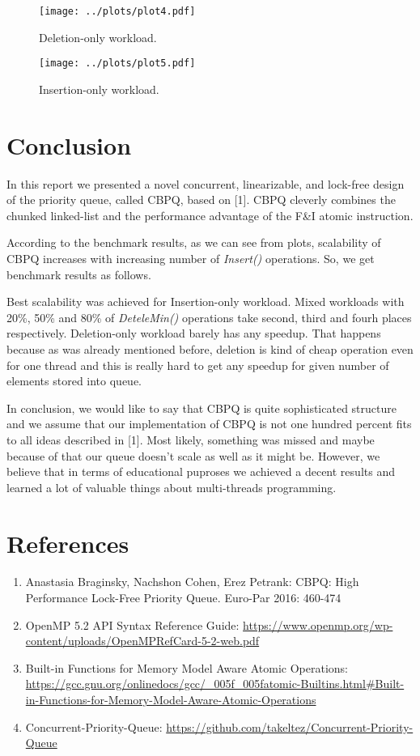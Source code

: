 \documentclass{article}
\begin{document}
\begin{figure}[H]
  \centering
  \texttt{[image: ../plots/plot4.pdf]}
  \caption{Deletion-only workload.}
  \label{fig:plot4}
\end{figure}

\begin{figure}[H]
  \centering
  \texttt{[image: ../plots/plot5.pdf]}
  \caption{Insertion-only workload.}
  \label{fig:plot5}
\end{figure}

\section{Conclusion}
In this report we presented a novel concurrent, linearizable, and lock-free design of the priority queue, called CBPQ, based on [1]. CBPQ cleverly combines the chunked linked-list and the performance advantage of the F\&I atomic instruction.\par
According to the benchmark results, as we can see from plots, scalability of CBPQ increases with increasing number of \textit{Insert()} operations. So, we get benchmark results as follows.\par
Best scalability was achieved for Insertion-only workload. Mixed workloads with 20\%, 50\% and 80\% of \textit{DeteleMin()} operations take second, third and fourh places respectively. Deletion-only workload barely has any speedup. That happens because as was already mentioned before, deletion is kind of cheap operation even for one thread and this is really hard to get any speedup for given number of elements stored into queue.\par
In conclusion, we would like to say that CBPQ is quite sophisticated structure and we assume that our implementation of CBPQ is not one hundred percent fits to all ideas described in [1]. Most likely, something was missed and maybe because of that our queue doesn't scale as well as it might be. However, we believe that in terms of educational puproses we achieved a decent results and learned a lot of valuable things about multi-threads programming.

\pagebreak
\section*{References}
\begin{enumerate}
\item{Anastasia Braginsky, Nachshon Cohen, Erez Petrank: CBPQ: High Performance Lock-Free Priority Queue. Euro-Par 2016: 460-474}
\item{OpenMP 5.2 API Syntax Reference Guide: \url{https://www.openmp.org/wp-content/uploads/OpenMPRefCard-5-2-web.pdf}}
\item{Built-in Functions for Memory Model Aware Atomic Operations: \url{https://gcc.gnu.org/onlinedocs/gcc/_005f_005fatomic-Builtins.html#Built-in-Functions-for-Memory-Model-Aware-Atomic-Operations}}
\item{Concurrent-Priority-Queue: \url{https://github.com/takeltez/Concurrent-Priority-Queue}}
\end{enumerate}
\end{document}
